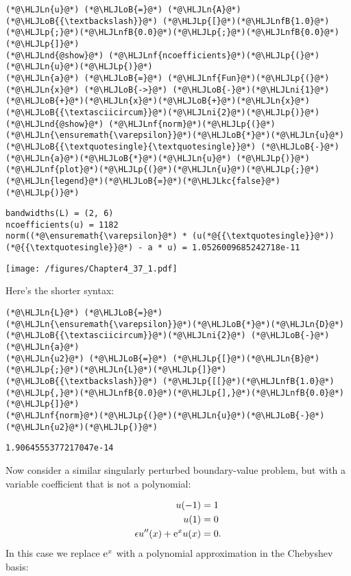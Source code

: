 \documentclass[12pt,landscape]{article}
\newcommand{\HLJLkc}[1]{\textcolor[RGB]{59,151,46}{\textit{#1}}}
\newcommand{\HLJLn}[1]{#1}
\newcommand{\HLJLnd}[1]{\textcolor[RGB]{214,102,97}{#1}}
\newcommand{\HLJLnf}[1]{\textcolor[RGB]{66,102,213}{#1}}
\newcommand{\HLJLnfB}[1]{\textcolor[RGB]{59,151,46}{#1}}
\newcommand{\HLJLni}[1]{\textcolor[RGB]{59,151,46}{#1}}
\newcommand{\HLJLoB}[1]{\textcolor[RGB]{102,102,102}{\textbf{#1}}}
\newcommand{\HLJLp}[1]{#1}
\begin{document}
{\begin{lstlisting}
(*@\HLJLn{u}@*) (*@\HLJLoB{=}@*) (*@\HLJLn{A}@*) (*@\HLJLoB{{\textbackslash}}@*) (*@\HLJLp{[}@*)(*@\HLJLnfB{1.0}@*)(*@\HLJLp{;}@*)(*@\HLJLnfB{0.0}@*)(*@\HLJLp{;}@*)(*@\HLJLnfB{0.0}@*)(*@\HLJLp{]}@*)
(*@\HLJLnd{@show}@*) (*@\HLJLnf{ncoefficients}@*)(*@\HLJLp{(}@*)(*@\HLJLn{u}@*)(*@\HLJLp{)}@*)
(*@\HLJLn{a}@*) (*@\HLJLoB{=}@*) (*@\HLJLnf{Fun}@*)(*@\HLJLp{(}@*)(*@\HLJLn{x}@*) (*@\HLJLoB{->}@*) (*@\HLJLoB{-}@*)(*@\HLJLni{1}@*)(*@\HLJLoB{+}@*)(*@\HLJLn{x}@*)(*@\HLJLoB{+}@*)(*@\HLJLn{x}@*)(*@\HLJLoB{{\textasciicircum}}@*)(*@\HLJLni{2}@*)(*@\HLJLp{)}@*)
(*@\HLJLnd{@show}@*) (*@\HLJLnf{norm}@*)(*@\HLJLp{(}@*)(*@\HLJLn{\ensuremath{\varepsilon}}@*)(*@\HLJLoB{*}@*)(*@\HLJLn{u}@*)(*@\HLJLoB{{\textquotesingle}{\textquotesingle}}@*) (*@\HLJLoB{-}@*) (*@\HLJLn{a}@*)(*@\HLJLoB{*}@*)(*@\HLJLn{u}@*) (*@\HLJLp{)}@*)
(*@\HLJLnf{plot}@*)(*@\HLJLp{(}@*)(*@\HLJLn{u}@*)(*@\HLJLp{;}@*) (*@\HLJLn{legend}@*)(*@\HLJLoB{=}@*)(*@\HLJLkc{false}@*)(*@\HLJLp{)}@*)
\end{lstlisting}

\begin{lstlisting}
bandwidths(L) = (2, 6)
ncoefficients(u) = 1182
norm((*@\ensuremath{\varepsilon}@*) * (u(*@{{\textquotesingle}}@*))(*@{{\textquotesingle}}@*) - a * u) = 1.0526009685242718e-11
\end{lstlisting}

\texttt{[image: /figures/Chapter4\_37\_1.pdf]}

Here's the shorter syntax:


\begin{lstlisting}
(*@\HLJLn{L}@*) (*@\HLJLoB{=}@*) (*@\HLJLn{\ensuremath{\varepsilon}}@*)(*@\HLJLoB{*}@*)(*@\HLJLn{D}@*)(*@\HLJLoB{{\textasciicircum}}@*)(*@\HLJLni{2}@*) (*@\HLJLoB{-}@*) (*@\HLJLn{a}@*)
(*@\HLJLn{u2}@*) (*@\HLJLoB{=}@*) (*@\HLJLp{[}@*)(*@\HLJLn{B}@*)(*@\HLJLp{;}@*)(*@\HLJLn{L}@*)(*@\HLJLp{]}@*) (*@\HLJLoB{{\textbackslash}}@*) (*@\HLJLp{[[}@*)(*@\HLJLnfB{1.0}@*)(*@\HLJLp{,}@*)(*@\HLJLnfB{0.0}@*)(*@\HLJLp{],}@*)(*@\HLJLnfB{0.0}@*)(*@\HLJLp{]}@*)
(*@\HLJLnf{norm}@*)(*@\HLJLp{(}@*)(*@\HLJLn{u}@*)(*@\HLJLoB{-}@*)(*@\HLJLn{u2}@*)(*@\HLJLp{)}@*)
\end{lstlisting}

\begin{lstlisting}
1.9064555377217047e-14
\end{lstlisting}


Now consider a similar singularly perturbed boundary-value problem, but with a variable coefficient that is not a polynomial:


\begin{align*}
u(-1) &= 1\\
u(1) &= 0\\
\epsilon u''(x) + {\rm e}^xu(x) &= 0.
\end{align*}
In this case we replace  ${\rm e}^{x}$ with a polynomial approximation in the Chebyshev basis:

}
\end{document}

